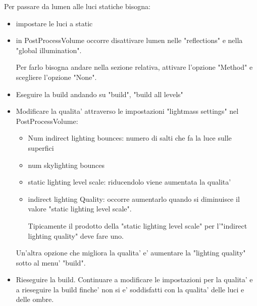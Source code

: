             Per passare da lumen alle luci statiche bisogna:
            \begin{itemize}
                \item impostare le luci a static
                \item in PostProcessVolume occorre disattivare lumen nelle "reflections" e nella "global illumination".

                    \begin{notebox}
                        Per farlo bisogna andare nella sezione relativa, attivare l'opzione "Method" e scegliere l'opzione "None".
                    \end{notebox}

                \item Eseguire la build andando su "build", "build all levels"
                \item Modificare la qualita' attraverso le impostazioni "lightmass settings" nel PostProcessVolume:
                    \begin{itemize}
                        \item Num indirect lighting bounces: numero di salti che fa la luce sulle superfici
                        \item num skylighting bounces
                        \item static lighting level scale: riducendolo viene aumentata la qualita'
                        \item indirect lighting Quality: occorre aumentarlo quando si diminuisce il valore "static lighting level scale".

                            \begin{notebox}
                                Tipicamente il prodotto della "static lighting level scale" per l'"indirect lighting quality" deve fare uno.
                            \end{notebox}
                    \end{itemize}

                    Un'altra opzione che migliora la qualita' e' aumentare la "lighting quality" sotto al menu' "build".

                \item Rieseguire la build. Continuare a modificare le impostazioni per la qualita' e a rieseguire la build finche' non si e' soddisfatti con la qualita' delle luci e delle ombre.
            \end{itemize}

